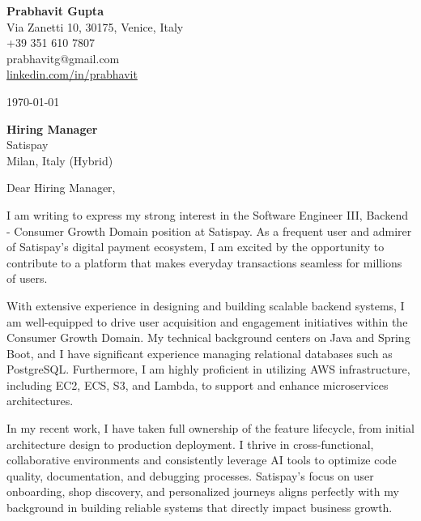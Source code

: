 \documentclass[11pt,a4paper]{article}
\begin{document}
\thispagestyle{empty}

\begin{flushleft}
\textbf{Prabhavit Gupta} \\
Via Zanetti 10, 30175, Venice, Italy \\
+39 351 610 7807 \\
prabhavitg@gmail.com \\
\href{https://www.linkedin.com/in/prabhavit/}{linkedin.com/in/prabhavit}
\end{flushleft}

\vspace{2em}
\today

\vspace{2em}
\begin{flushleft}
\textbf{Hiring Manager} \\
Satispay \\
Milan, Italy (Hybrid)
\end{flushleft}

\vspace{2em}
\noindent Dear Hiring Manager,

\vspace{1em}
\noindent I am writing to express my strong interest in the Software Engineer III, Backend - Consumer Growth Domain position at Satispay. As a frequent user and admirer of Satispay's digital payment ecosystem, I am excited by the opportunity to contribute to a platform that makes everyday transactions seamless for millions of users. 

\vspace{1em}
\noindent With extensive experience in designing and building scalable backend systems, I am well-equipped to drive user acquisition and engagement initiatives within the Consumer Growth Domain. My technical background centers on Java and Spring Boot, and I have significant experience managing relational databases such as PostgreSQL. Furthermore, I am highly proficient in utilizing AWS infrastructure, including EC2, ECS, S3, and Lambda, to support and enhance microservices architectures.

\vspace{1em}
\noindent In my recent work, I have taken full ownership of the feature lifecycle, from initial architecture design to production deployment. I thrive in cross-functional, collaborative environments and consistently leverage AI tools to optimize code quality, documentation, and debugging processes. Satispay's focus on user onboarding, shop discovery, and personalized journeys aligns perfectly with my background in building reliable systems that directly impact business growth.
\end{document}
